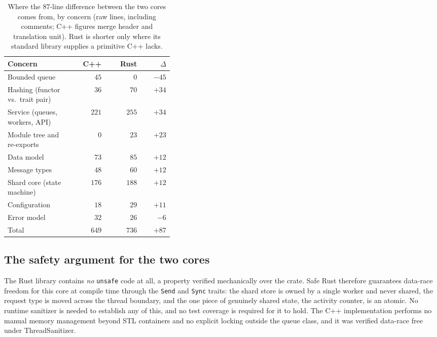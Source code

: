 \documentclass[english,twoside,openright,a4paper,censored,csm,software-track-2020]{HYthesisML}
\begin{document}
\begin{table}
\centering
\small
\caption{Where the $87$-line difference between the two cores comes from, by concern (raw
lines, including comments; C++ figures merge header and translation unit). Rust is shorter
only where its standard library supplies a primitive C++ lacks.\label{tab:loc}}
\begin{tabular}{@{}R{0.38\linewidth} r r r@{}}
\hline\hline
Concern & C++ & Rust & $\Delta$ \\
\hline
Bounded queue                     & $45$  & $0$   & $-45$ \\
Hashing (functor vs.\ trait pair) & $36$  & $70$  & $+34$ \\
Service (queues, workers, API)    & $221$ & $255$ & $+34$ \\
Module tree and re-exports        & $0$   & $23$  & $+23$ \\
Data model                        & $73$  & $85$  & $+12$ \\
Message types                     & $48$  & $60$  & $+12$ \\
Shard core (state machine)        & $176$ & $188$ & $+12$ \\
Configuration                     & $18$  & $29$  & $+11$ \\
Error model                       & $32$  & $26$  & $-6$ \\
\hline
Total                             & $649$ & $736$ & $+87$ \\
\hline
\end{tabular}
\end{table}

\subsection{The safety argument for the two cores}
The Rust library contains \emph{no} \texttt{unsafe} code at all, a property verified
mechanically over the crate. Safe Rust therefore guarantees data-race freedom for this core at
compile time through the \texttt{Send} and \texttt{Sync} traits: the shard store is owned by a
single worker and never shared, the request type is moved across the thread boundary, and the
one piece of genuinely shared state, the activity counter, is an atomic. No runtime sanitizer
is needed to establish any of this, and no test coverage is required for it to hold. The C++
implementation performs no manual memory management beyond STL containers and no explicit
locking outside the queue class, and it was verified data-race free under ThreadSanitizer.
\end{document}
